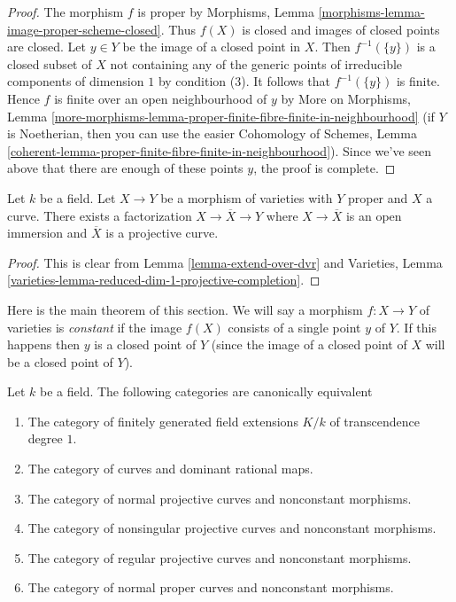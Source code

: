 \begin{proof}
The morphism $f$ is proper by
Morphisms, Lemma \ref{morphisms-lemma-image-proper-scheme-closed}.
Thus $f(X)$ is closed and images of closed points are closed.
Let $y \in Y$ be the image of a closed point in $X$.
Then $f^{-1}(\{y\})$ is a closed subset of $X$ not
containing any of the generic points of irreducible components
of dimension $1$ by condition (3). It follows that $f^{-1}(\{y\})$
is finite. Hence $f$ is finite over an open neighbourhood of $y$
by
More on Morphisms, Lemma
\ref{more-morphisms-lemma-proper-finite-fibre-finite-in-neighbourhood}
(if $Y$ is Noetherian, then you can use the easier
Cohomology of Schemes, Lemma
\ref{coherent-lemma-proper-finite-fibre-finite-in-neighbourhood}).
Since we've seen above that there are enough of these points
$y$, the proof is complete.
\end{proof}

\begin{lemma}
\label{lemma-extend-to-completion}
Let $k$ be a field. Let $X \to Y$ be a morphism of varieties
with $Y$ proper and $X$ a curve.
There exists a factorization $X \to \overline{X} \to Y$
where $X \to \overline{X}$ is an open immersion
and $\overline{X}$ is a projective curve.
\end{lemma}

\begin{proof}
This is clear from Lemma \ref{lemma-extend-over-dvr}
and Varieties, Lemma \ref{varieties-lemma-reduced-dim-1-projective-completion}.
\end{proof}

\noindent
Here is the main theorem of this section. We will say a morphism
$f : X \to Y$ of varieties is {\it constant} if the image $f(X)$
consists of a single point $y$ of $Y$. If this happens then
$y$ is a closed point of $Y$ (since the image of a closed point
of $X$ will be a closed point of $Y$).

\begin{theorem}
\label{theorem-curves-rational-maps}
Let $k$ be a field. The following categories are canonically equivalent
\begin{enumerate}
\item The category of finitely generated field extensions $K/k$ of
transcendence degree $1$.
\item The category of curves and dominant rational maps.
\item The category of normal projective curves and nonconstant morphisms.
\item The category of nonsingular projective curves and nonconstant morphisms.
\item The category of regular projective curves and nonconstant morphisms.
\item The category of normal proper curves and nonconstant morphisms.
\end{enumerate}
\end{theorem}

